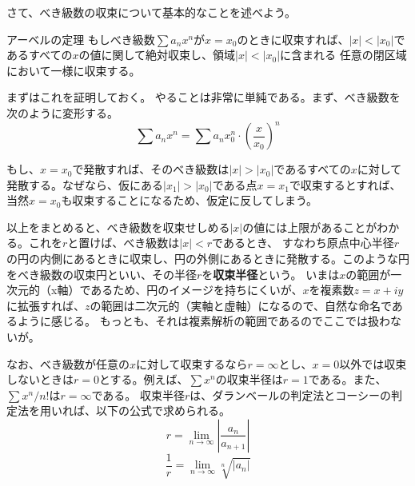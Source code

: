 \documentclass[a4j,dvipdfmx]{jsarticle}
\begin{document}
                さて、べき級数の収束について基本的なことを述べよう。
                \begin{itembox}{アーベルの定理}
                    もしべき級数$\sum a_nx^n$が$x=x_0$のときに収束すれば、$|x|<|x_0|$であるすべての$x$の値に関して絶対収束し、領域$|x|<|x_0|$に含まれる
                    任意の閉区域において一様に収束する。
                \end{itembox}
                まずはこれを証明しておく。  やることは非常に単純である。まず、べき級数を次のように変形する。
                \begin{equation*}
                    \sum a_nx^n = \sum a_n x_0^n\cdot\left(\frac{x}{x_0}\right)^n
                \end{equation*}


                もし、$x=x_0$で発散すれば、そのべき級数は$|x|>|x_0|$であるすべての$x$に対して発散する。なぜなら、仮にある$|x_1|>|x_0|$である点$x=x_1$で収束するとすれば、当然$x=x_0$も収束することになるため、仮定に反してしまう。

                以上をまとめると、べき級数を収束せしめる$|x|$の値には上限があることがわかる。これを$r$と置けば、べき級数は$|x|<r$であるとき、
                すなわち原点中心半径$r$の円の内側にあるときに収束し、円の外側にあるときに発散する。このような円をべき級数の収束円といい、その半径$r$を\textbf{収束半径}という。
                いまは$x$の範囲が一次元的（x軸）であるため、円のイメージを持ちにくいが、$x$を複素数$z=x+iy$に拡張すれば、$z$の範囲は二次元的（実軸と虚軸）になるので、自然な命名であるように感じる。
                もっとも、それは複素解析の範囲であるのでここでは扱わないが。

                なお、べき級数が任意の$x$に対して収束するなら$r=\infty$とし、$x=0$以外では収束しないときは$r=0$とする。例えば、$\sum x^n$の収束半径は$r=1$である。また、$\sum x^n/n!$は$r=\infty$である。
                \clearpage
                収束半径$r$は、ダランベールの判定法とコーシーの判定法を用いれば、以下の公式で求められる。
                \begin{equation}
                    r=\lim_{n\to\infty}\left|\frac{a_n}{a_{n+1}}\right|\label{eq:ダランベールの判定法と収束半径}
                \end{equation}
                \begin{equation}
                    \frac{1}{r}=\lim_{n\to\infty}\sqrt[n]{|a_n|}\label{eq:コーシーの判定法と収束半径}
                \end{equation}
\end{document}

